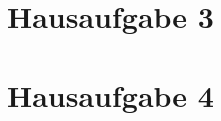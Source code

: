 \documentclass[10pt,paper=a4,abstracton]{scrartcl}
\begin{document}
%
%
%
%


\section{Hausaufgabe 3}


\section{Hausaufgabe 4}




\end{document}
